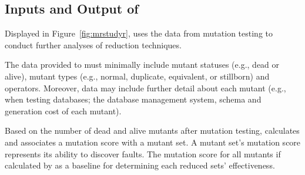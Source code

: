 \subsection{Inputs and Output of \mr}

Displayed in Figure~\ref{fig:mrstudyr}, \mr uses the data
from mutation testing to conduct further analyses of reduction techniques.

The data provided to \mr must minimally include mutant statuses (e.g., dead or alive),
mutant types (e.g., normal, duplicate, equivalent, or stillborn)
and operators. Moreover, data may include further detail about each mutant (e.g.,
when testing databases; the database management system, schema and generation cost of each mutant).

Based on the number of dead and alive mutants after mutation testing,
\mr calculates and associates a mutation score with a mutant set.
A mutant set's mutation score represents its ability to discover faults.
The mutation score for all mutants if calculated by \mr as a baseline
for determining each reduced sets' effectiveness.
